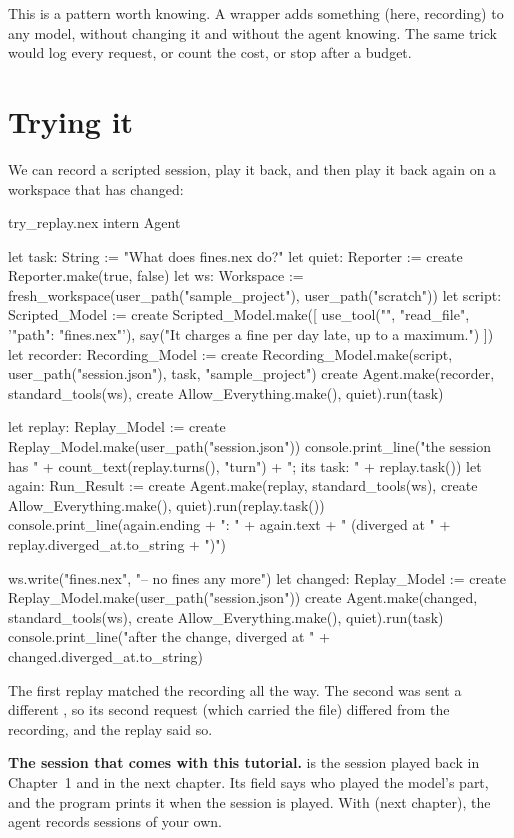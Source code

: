 This is a pattern worth knowing. A wrapper adds something (here,
recording) to any model, without changing it and without the agent
knowing. The same trick would log every request, or count the cost, or
stop after a budget.

\section{Trying it}

We can record a scripted session, play it back, and then play it back
again on a workspace that has changed:

\begin{tryit}{try_replay.nex}
intern Agent

let task: String := "What does fines.nex do?"
let quiet: Reporter := create Reporter.make(true, false)
let ws: Workspace := fresh_workspace(user_path("sample_project"), user_path("scratch"))
let script: Scripted_Model := create Scripted_Model.make([
  use_tool("", "read_file", '{"path": "fines.nex"}'),
  say("It charges a fine per day late, up to a maximum.")
])
let recorder: Recording_Model := create Recording_Model.make(script,
  user_path("session.json"), task, "sample_project")
create Agent.make(recorder, standard_tools(ws), create Allow_Everything.make(), quiet).run(task)

let replay: Replay_Model := create Replay_Model.make(user_path("session.json"))
console.print_line("the session has " + count_text(replay.turns(), "turn")
  + "; its task: " + replay.task())
let again: Run_Result := create Agent.make(replay, standard_tools(ws),
  create Allow_Everything.make(), quiet).run(replay.task())
console.print_line(again.ending + ": " + again.text + " (diverged at "
  + replay.diverged_at.to_string + ")")

ws.write("fines.nex", "-- no fines any more\n")
let changed: Replay_Model := create Replay_Model.make(user_path("session.json"))
create Agent.make(changed, standard_tools(ws), create Allow_Everything.make(), quiet).run(task)
console.print_line("after the change, diverged at " + changed.diverged_at.to_string)
\end{tryit}

The first replay matched the recording all the way. The second was sent a
different , so its second request (which carried the file)
differed from the recording, and the replay said so.

\begin{aside}
\textbf{The session that comes with this tutorial.}
 is the session played back in
Chapter~1 and in the next chapter. Its  field says who played
the model's part, and the program prints it when the session is played.
With  (next chapter), the agent records sessions of your
own.
\end{aside}
